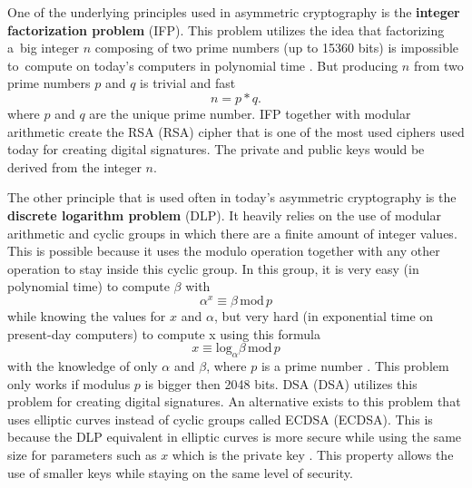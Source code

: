 One of the underlying principles used in asymmetric cryptography is the \textbf{integer factorization problem} (\acs{IFP}). This problem utilizes the idea that factorizing a~big integer $n$ composing of two prime numbers (up to 15360 bits) is impossible to~compute on today's computers in polynomial time \cite{Paar2010}. But producing $n$ from two prime numbers $p$ and $q$ is trivial and fast
\begin{equation}
  n=p*q.
\end{equation}
where $p$ and $q$ are the unique prime number. IFP together with modular arithmetic create the RSA (\acl{RSA}) cipher that is one of the most used ciphers used today for creating digital signatures. The private and public keys would be derived from the integer $n$.

The other principle that is used often in today's asymmetric cryptography is the \textbf{discrete logarithm problem} (\acs{DLP}). It heavily relies on the use of modular arithmetic and cyclic groups in which there are a finite amount of integer values. This is possible because it uses the modulo operation together with any other operation to stay inside this cyclic group. In this group, it is very easy (in polynomial time) to compute $\beta$ with
\begin{equation}
  \alpha^x\equiv\beta\,\mathrm{mod}\,p
\end{equation}
while knowing the values for $x$ and $\alpha$, but very hard (in exponential time on present-day computers) to compute x using this formula
\begin{equation}
  x\equiv\mathrm{log}_\alpha\beta\,\mathrm{mod}\,p
\end{equation}
with the knowledge of only $\alpha$ and $\beta$, where $p$ is a prime number \cite{Paar2010}. This problem only works if modulus $p$ is bigger then 2048 bits. DSA (\acl{DSA}) utilizes this problem for creating digital signatures. An alternative exists to this problem that uses elliptic curves instead of cyclic groups called ECDSA (\acl{ECDSA}). This is because the DLP equivalent in elliptic curves is more secure while using the same size for parameters such as $x$ which is the private key \cite{Ristic2014}. This property allows the use of smaller keys while staying on the same level of security.
